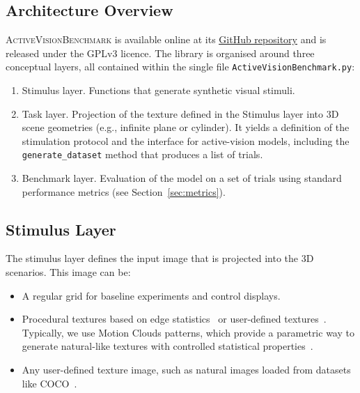 \documentclass[12pt,a4paper]{article}
\newcommand{\avb}{\textsc{ActiveVisionBenchmark}}  %
\begin{document}
\subsection{Architecture Overview}
\avb{} is available online at its \href{https://github.com/laurentperrinet/ActiveVisionBenchmark}{\color{blue}\underline{GitHub repository}} and is released under the GPLv3 licence. The library is organised around three conceptual layers, all contained within the single file \texttt{ActiveVisionBenchmark.py}:

\begin{enumerate}
  \item Stimulus layer. Functions that generate synthetic visual stimuli.

  \item Task layer. Projection of the texture defined in the Stimulus layer into 3D scene geometries (e.g., infinite plane or cylinder). It yields a definition of the stimulation protocol and the interface for active-vision models, including the \texttt{generate\_dataset} method that produces a list of trials.

  \item Benchmark layer. Evaluation of the model on a set of trials using standard performance metrics (see Section~\ref{sec:metrics}).
\end{enumerate}

\subsection{Stimulus Layer}
The stimulus layer defines the input image that is projected into the 3D scenarios. This image can be:
\begin{itemize}
    \item A regular grid for baseline experiments and control displays.
    \item Procedural textures based on edge statistics~\parencite{PortillaSimoncelli2000} or user-defined textures~\parencite{Wandell1995}. Typically, we use Motion Clouds patterns, which provide a parametric way to generate natural-like textures with controlled statistical properties~\parencite{SanzLeon2012}.
    \item Any user-defined texture image, such as natural images loaded from datasets like COCO~\parencite{Lin2014}.
\end{itemize}
\end{document}
